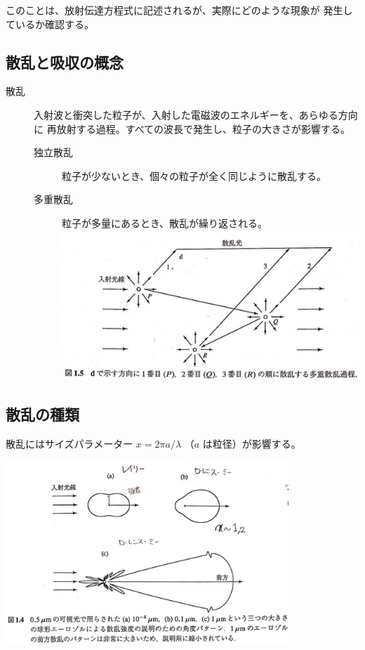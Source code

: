 \documentclass[article]{dennou777}
\newcommand{\centeralign}[1]{\rule{0pt}{0pt}\hfill#1\hfill\rule{0pt}{0pt}}
\begin{document}
このことは、放射伝達方程式に記述されるが、実際にどのような現象が
発生しているか確認する。

\subsection{散乱と吸収の概念}
\begin{description}
	\item[散乱] 入射波と衝突した粒子が、入射した電磁波のエネルギーを、あらゆる方向に
		再放射する過程。すべての波長で発生し、粒子の大きさが影響する。
		\begin{description}
			\item[独立散乱] 粒子が少ないとき、個々の粒子が全く同じように散乱する。
			\item[多重散乱] 粒子が多量にあるとき、散乱が繰り返される。\\
				\includegraphics[width=\linewidth]{mscatter.jpg}
		\end{description}
\end{description}

\subsection{散乱の種類}
散乱にはサイズパラメーター $x=2\pi a/\lambda$ （$a$ は粒径）が影響する。

\centeralign{\includegraphics[width=0.8\textwidth]{scatter.jpg}}
\end{document}
